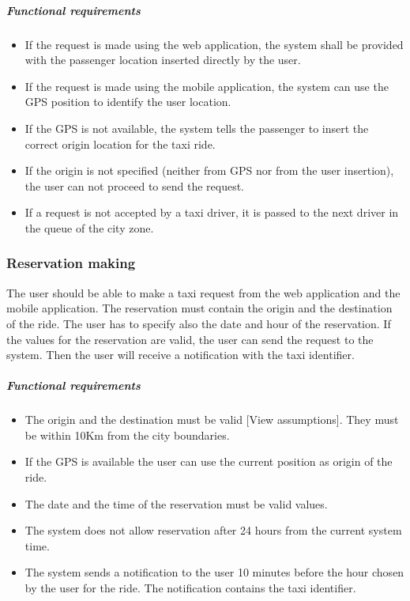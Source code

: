 	\subparagraph{Functional requirements}
	\noindent
		\begin{itemize}
			\item If the request is made using the web application, the system shall be provided with the passenger location inserted directly by the user.
			\item If the request is made using the mobile application, the system can use the GPS position to identify the user location.
			\item If the GPS is not available, the system tells the passenger to insert the correct origin location for the taxi ride.
			\item If the origin is not specified (neither from GPS nor from the user insertion), the user can not proceed to send the request.
			\item If a request is not accepted by a taxi driver, it is passed to the next driver in the queue of the city zone.
		\end{itemize}


\subsubsection{Reservation making}
The user should be able to make a taxi request from the web application and the mobile application. The reservation must contain the origin and the destination of the ride. The user has to specify also the date and hour of the reservation. If the values for the reservation are valid, the user can send the request to the system. Then the user will receive a notification with the taxi identifier.

	\subparagraph{Functional requirements}
	\noindent
		\begin{itemize}
			\item The origin and the destination must be valid [View assumptions]. They must be within 10Km from the city boundaries.
			\item If the GPS is available the user can use the current position as origin of the ride.
			\item The date and the time of the reservation must be valid values.
			\item The system does not allow reservation after 24 hours from the current system time.
			\item The system sends a notification to the user 10 minutes before the hour chosen by the user for the ride. The notification contains the taxi identifier.
		\end{itemize}


